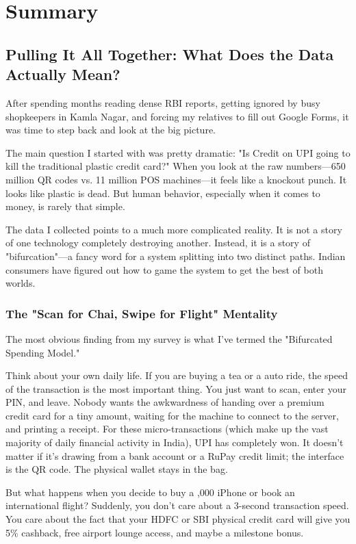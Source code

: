 \chapter{Summary}

\section{Pulling It All Together: What Does the Data Actually Mean?}

After spending months reading dense RBI reports, getting ignored by busy shopkeepers in Kamla Nagar, and forcing my relatives to fill out Google Forms, it was time to step back and look at the big picture.

The main question I started with was pretty dramatic: "Is Credit on UPI going to kill the traditional plastic credit card?" When you look at the raw numbers---650 million QR codes vs. 11 million POS machines---it feels like a knockout punch. It looks like plastic is dead. But human behavior, especially when it comes to money, is rarely that simple.

The data I collected points to a much more complicated reality. It is not a story of one technology completely destroying another. Instead, it is a story of "bifurcation"---a fancy word for a system splitting into two distinct paths. Indian consumers have figured out how to game the system to get the best of both worlds.

\subsection{The "Scan for Chai, Swipe for Flight" Mentality}

The most obvious finding from my survey is what I've termed the "Bifurcated Spending Model."

Think about your own daily life. If you are buying a  tea or a  auto ride, the speed of the transaction is the most important thing. You just want to scan, enter your PIN, and leave. Nobody wants the awkwardness of handing over a premium credit card for a tiny amount, waiting for the machine to connect to the server, and printing a receipt. For these micro-transactions (which make up the vast majority of daily financial activity in India), UPI has completely won. It doesn't matter if it's drawing from a bank account or a RuPay credit limit; the interface is the QR code. The physical wallet stays in the bag.

But what happens when you decide to buy a ,000 iPhone or book an international flight? Suddenly, you don't care about a 3-second transaction speed. You care about the fact that your HDFC or SBI physical credit card will give you 5\% cashback, free airport lounge access, and maybe a milestone bonus.

